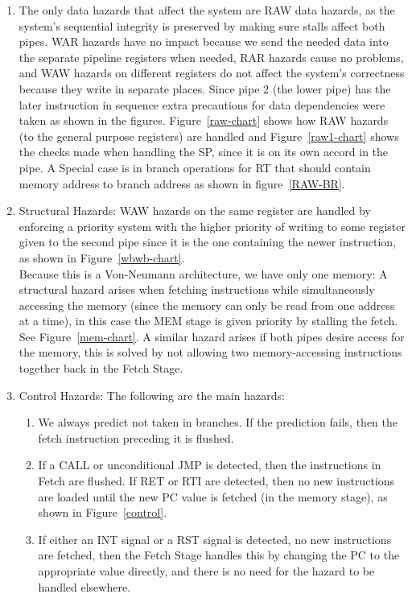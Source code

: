 \documentclass[12pt]{article}
\theoremstyle{plain}
\theoremstyle{definition}
\begin{document}
\begin{enumerate}
\item The only data hazards that affect the system are RAW data hazards, as the system's sequential integrity is preserved by making sure stalls affect both pipes. WAR hazards have no impact because we send the needed data into the separate pipeline registers when needed, RAR hazards cause no problems, and WAW hazards on different registers do not affect the system's correctness because they write in separate places. Since pipe 2 (the lower pipe) has the later instruction in sequence extra precautions for data dependencies were taken as shown in the figures. Figure~\ref{raw-chart} shows how RAW hazards (to the general purpose registers) are handled and Figure~\ref{raw1-chart} shows the checks made when handling the SP, since it is on its own accord in the pipe. A Special case is in branch operations for RT that should contain memory address to branch address as shown in figure~\ref{RAW-BR}.
\item Structural Hazards: WAW hazards on the same register are handled by enforcing a priority system with the higher priority of writing to some register given to the second pipe since it is the one containing the newer instruction, as shown in Figure~\ref{wbwb-chart}.
\\ Because this is a Von-Neumann architecture, we have only one memory: A structural hazard arises when fetching instructions while simultaneously accessing the memory (since the memory can only be read from one address at a time), in this case the MEM stage is given priority by stalling the fetch. See Figure~\ref{mem-chart}. A similar hazard arises if both pipes desire access for the memory, this is solved by not allowing two memory-accessing instructions together back in the Fetch Stage.
\item Control Hazards: The following are the main hazards:
\begin{enumerate}
    \item We always predict not taken in branches. If the prediction fails, then the fetch instruction preceding it is flushed. 
    \item If a CALL or unconditional JMP is detected, then the instructions in Fetch are flushed. If RET or RTI are detected, then no new instructions are loaded until the new PC value is fetched (in the memory stage), as shown in Figure~\ref{control}.
    \item If either an INT signal or a RST signal is detected, no new instructions are fetched, then the Fetch Stage handles this by changing the PC to the appropriate value directly, and there is no need for the hazard to be handled elsewhere.
\end{enumerate}
\end{enumerate}
\end{document}
